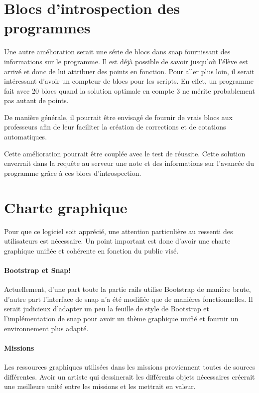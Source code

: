 \section{Blocs d'introspection des programmes}
Une autre amélioration serait une série de \glspl{bloc} dans \gls{snap} fournissant des informations sur le programme. Il est déjà possible de savoir jusqu'où l'élève est arrivé et donc de lui attribuer des points en fonction.
Pour aller plus loin, il serait intéressant d'avoir un compteur de \glspl{bloc}  pour les \glspl{script}. En effet, un programme fait avec 20 \glspl{bloc}  quand la solution optimale en compte 3 ne mérite probablement pas autant de points.

De manière générale, il pourrait être envisagé de fournir de vrais \glspl{bloc}  aux professeurs afin de leur faciliter la création de corrections et de cotations automatiques.

Cette amélioration pourrait être couplée avec le test de réussite. Cette solution enverrait dans la requête au serveur une note et des informations sur l'avancée du programme grâce à ces \glspl{bloc}  d'introspection.

\section{Charte graphique}
Pour que ce logiciel soit apprécié, une attention particulière au ressenti des utilisateurs est nécessaire. Un point important est donc d'avoir une charte graphique unifiée et cohérente en fonction du public visé.

\paragraph{Bootstrap et Snap!}
Actuellement, d'une part toute la partie \gls{rails} utilise Bootstrap de manière brute, d'autre part l'interface de \gls{snap} n'a été modifiée que de manières fonctionnelles. Il serait judicieux d'adapter un peu la feuille de style de Bootstrap et l'implémentation de \gls{snap} pour avoir un thème graphique unifié et fournir un environnement plus adapté.

\paragraph{Missions}
Les ressources graphiques utilisées dans les \glspl{mission} proviennent toutes de sources différentes. Avoir un artiste qui dessinerait les différents objets nécessaires créerait une meilleure unité entre les \glspl{mission} et les mettrait en valeur.

